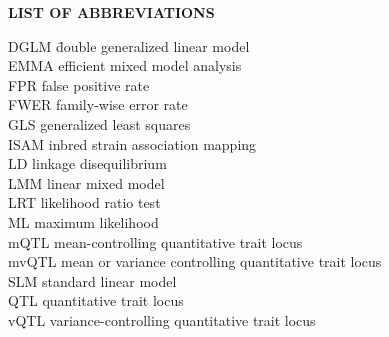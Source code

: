 {}

\begin{center}
{\Large \textbf{LIST OF ABBREVIATIONS}}
\end{center}

\newcommand{\Ab}[2]{\noindent  #1 \> #2 \\}
\newcommand{\Abi}[2]{\noindent #1 \hspace{1.5cm} \= #2 \\}

\begin{tabbing}
\Abi{DGLM}{double generalized linear model}
\Ab{EMMA}{efficient mixed model analysis}
\Ab{FPR}{false positive rate}
\Ab{FWER}{family-wise error rate}
\Ab{GLS}{generalized least squares}
\Ab{ISAM}{inbred strain association mapping}
\Ab{LD}{linkage disequilibrium}
\Ab{LMM}{linear mixed model}
\Ab{LRT}{likelihood ratio test}
\Ab{ML}{maximum likelihood}
\Ab{mQTL}{mean-controlling quantitative trait locus}
\Ab{mvQTL}{mean or variance controlling quantitative trait locus}
\Ab{SLM}{standard linear model}
\Ab{QTL}{quantitative trait locus}
\Ab{vQTL}{variance-controlling quantitative trait locus}
\end{tabbing}

\clearpage

